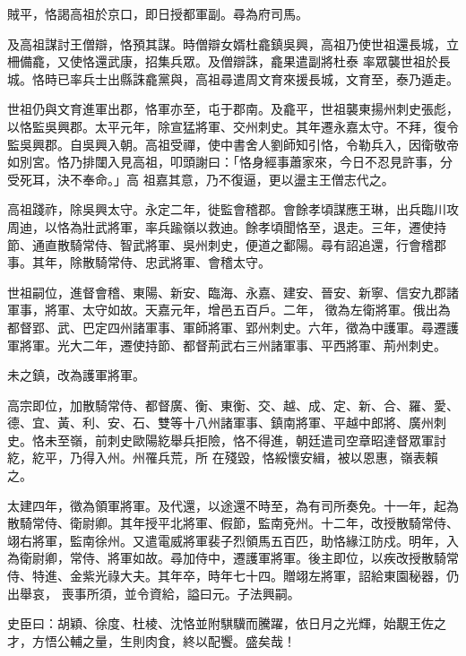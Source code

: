 \begin{pinyinscope}
 賊平，恪謁高祖於京口，即日授都軍副。尋為府司馬。



 及高祖謀討王僧辯，恪預其謀。時僧辯女婿杜龕鎮吳興，高祖乃使世祖還長城，立柵備龕，又使恪還武康，招集兵眾。及僧辯誅，龕果遣副將杜泰
 率眾襲世祖於長城。恪時已率兵士出縣誅龕黨與，高祖尋遣周文育來援長城，文育至，泰乃遁走。



 世祖仍與文育進軍出郡，恪軍亦至，屯于郡南。及龕平，世祖襲東揚州刺史張彪，以恪監吳興郡。太平元年，除宣猛將軍、交州刺史。其年遷永嘉太守。不拜，復令監吳興郡。自吳興入朝。高祖受禪，使中書舍人劉師知引恪，令勒兵入，因衛敬帝如別宮。恪乃排闥入見高祖，叩頭謝曰：「恪身經事蕭家來，今日不忍見許事，分受死耳，決不奉命。」高
 祖嘉其意，乃不復逼，更以盪主王僧志代之。



 高祖踐祚，除吳興太守。永定二年，徙監會稽郡。會餘孝頃謀應王琳，出兵臨川攻周迪，以恪為壯武將軍，率兵踰嶺以救迪。餘孝頃聞恪至，退走。三年，遷使持節、通直散騎常侍、智武將軍、吳州刺史，便道之鄱陽。尋有詔追還，行會稽郡事。其年，除散騎常侍、忠武將軍、會稽太守。



 世祖嗣位，進督會稽、東陽、新安、臨海、永嘉、建安、晉安、新寧、信安九郡諸軍事，將軍、太守如故。天嘉元年，增邑五百戶。二年，
 徵為左衛將軍。俄出為都督郢、武、巴定四州諸軍事、軍師將軍、郢州刺史。六年，徵為中護軍。尋遷護軍將軍。光大二年，遷使持節、都督荊武右三州諸軍事、平西將軍、荊州刺史。



 未之鎮，改為護軍將軍。



 高宗即位，加散騎常侍、都督廣、衡、東衡、交、越、成、定、新、合、羅、愛、德、宜、黃、利、安、石、雙等十八州諸軍事、鎮南將軍、平越中郎將、廣州刺史。恪未至嶺，前刺史歐陽紇舉兵拒險，恪不得進，朝廷遣司空章昭達督眾軍討紇，紇平，乃得入州。州罹兵荒，所
 在殘毀，恪綏懷安緝，被以恩惠，嶺表賴之。



 太建四年，徵為領軍將軍。及代還，以途還不時至，為有司所奏免。十一年，起為散騎常侍、衛尉卿。其年授平北將軍、假節，監南兗州。十二年，改授散騎常侍、翊右將軍，監南徐州。又遣電威將軍裴子烈領馬五百匹，助恪緣江防戍。明年，入為衛尉卿，常侍、將軍如故。尋加侍中，遷護軍將軍。後主即位，以疾改授散騎常侍、特進、金紫光祿大夫。其年卒，時年七十四。贈翊左將軍，詔給東園秘器，仍出舉哀，
 喪事所須，並令資給，謚曰元。子法興嗣。



 史臣曰：胡穎、徐度、杜棱、沈恪並附騏驥而騰躍，依日月之光輝，始覯王佐之才，方悟公輔之量，生則肉食，終以配饗。盛矣哉！



\end{pinyinscope}